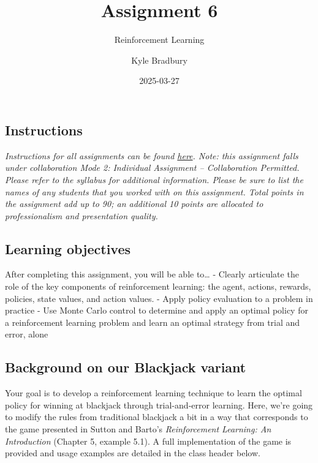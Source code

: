 \documentclass[
  letterpaper,
  DIV=11,
  numbers=noendperiod]{scrartcl}
\title{Assignment 6}
\subtitle{Reinforcement Learning}
\author{Kyle Bradbury}
\date{2025-03-27}
\renewcommand*\contentsname{Table of contents}
\newcommand\contentsname{Table of contents}
\begin{document}
\maketitle

\renewcommand*\contentsname{Table of contents}
{
\hypersetup{linkcolor=}
\setcounter{tocdepth}{1}
\tableofcontents
}

\subsection{Instructions}\label{instructions}

\emph{Instructions for all assignments can be found
\href{https://kylebradbury.github.io/ids705/notebooks/assignment_instructions.html}{here}.
Note: this assignment falls under collaboration Mode 2: Individual
Assignment -- Collaboration Permitted. Please refer to the syllabus for
additional information. Please be sure to list the names of any students
that you worked with on this assignment. Total points in the assignment
add up to 90; an additional 10 points are allocated to professionalism
and presentation quality.}

\subsection{Learning objectives}\label{learning-objectives}

After completing this assignment, you will be able to\ldots{} - Clearly
articulate the role of the key components of reinforcement learning: the
agent, actions, rewards, policies, state values, and action values. -
Apply policy evaluation to a problem in practice - Use Monte Carlo
control to determine and apply an optimal policy for a reinforcement
learning problem and learn an optimal strategy from trial and error,
alone

\subsection{Background on our Blackjack
variant}\label{background-on-our-blackjack-variant}

Your goal is to develop a reinforcement learning technique to learn the
optimal policy for winning at blackjack through trial-and-error
learning. Here, we're going to modify the rules from traditional
blackjack a bit in a way that corresponds to the game presented in
Sutton and Barto's \emph{Reinforcement Learning: An Introduction}
(Chapter 5, example 5.1). A full implementation of the game is provided
and usage examples are detailed in the class header below.
\end{document}
